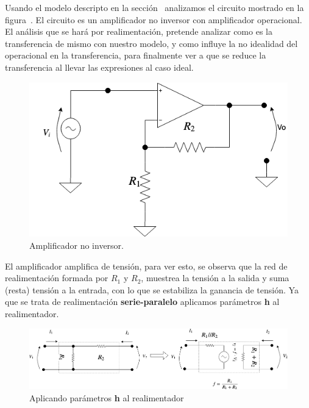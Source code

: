 Usando el modelo descripto en la sección~ analizamos el circuito mostrado en la figura~. El circuito es un amplificador no inversor con amplificador operacional. El análisis que se hará por realimentación, pretende analizar como es la transferencia de mismo con nuestro modelo, y como influye la no idealidad del operacional en la transferencia, para finalmente ver a que se reduce la transferencia al llevar las expresiones al caso ideal.

\begin{figure}[H] %
\begin{center}
\includegraphics[width=0.5 \textwidth, angle=0]{./img/operacionales/OP_NINV.png}
\caption{\label{fig:fig_operational_ideal_non_inverter}\footnotesize{Amplificador no inversor.}}
\end{center}
\end{figure}

El amplificador amplifica de tensión, para ver esto, se observa que la red de realimentación formada por $R_{1}$ y $R_{2}$, muestrea la tensión a la salida y suma (resta) tensión a la entrada, con lo que se estabiliza la ganancia de tensión. Ya que se trata de realimentación \textbf{serie-paralelo} aplicamos parámetros \textbf{h} al realimentador.



\begin{figure}[H] %
\begin{center}
\includegraphics[width=0.9 \textwidth, angle=0]{./img/operacionales/OP_NINV_FEEDBACK.png}
\caption{\label{fig:fig_ninv_feedback}\footnotesize{Aplicando parámetros \textbf{h} al realimentador}}
\end{center}
\end{figure}



